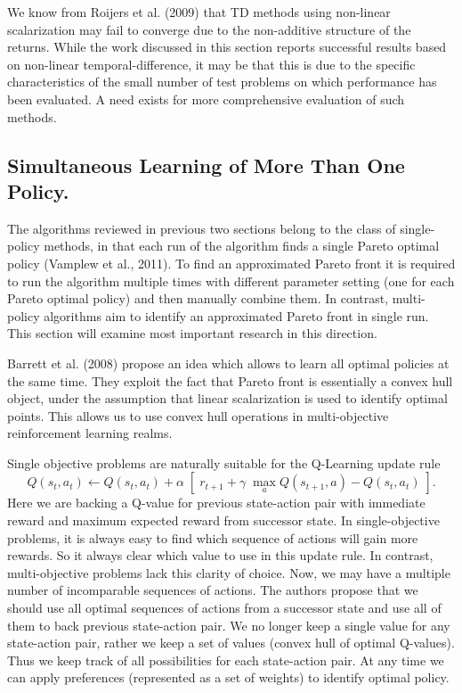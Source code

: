 We know from Roijers et al. (2009)\nocite{roijers2013survey} that TD methods using non-linear scalarization may fail to converge due to the non-additive structure of the returns. While the work discussed in this section reports successful results based on non-linear temporal-difference, it may be that this is due to the specific characteristics of the small number of test problems on which performance has been evaluated. A need exists for more comprehensive evaluation of such methods.

\subsection{Simultaneous Learning of More Than One Policy.}

The algorithms reviewed in previous two sections belong to the class of single-policy methods, in that each run of the algorithm finds a single Pareto optimal policy (Vamplew et al., 2011\nocite{vamplew2011empirical}). To find an approximated Pareto front it is required to run the algorithm multiple times with different parameter setting (one for each Pareto optimal policy) and then manually combine them. In contrast, multi-policy algorithms aim to identify an approximated Pareto front in single run. This section will examine most important research in this direction.

Barrett et al. (2008) \nocite{barrett2008learning} propose an idea which allows to learn all optimal policies at the same time. They exploit the fact that Pareto front is essentially a convex hull object, under the assumption that linear scalarization is used to identify optimal points. This allows us to use convex hull operations in multi-objective reinforcement learning realms.

Single objective problems are naturally suitable for the Q-Learning update rule
$$ Q(s_{t},a_{t}) \leftarrow Q(s_{t},a_{t}) + \alpha \; \left[\;r_{t+1} + \gamma\; \max_{a}Q(s_{t+1},a) - Q(s_{t},a_{t})\;\right]. $$
Here we are backing a Q-value for previous state-action pair with immediate reward and maximum expected reward from successor state. In single-objective problems, it is always easy to find which sequence of actions will gain more rewards. So it always clear which value to use in this update rule. In contrast, multi-objective problems lack this clarity of choice. Now, we may have a multiple number of incomparable sequences of actions. The authors propose that we should use all optimal sequences of actions from a successor state and use all of them to back previous state-action pair. We no longer keep a single value for any state-action pair, rather we keep a set of values (convex hull of optimal Q-values). Thus we keep track of all possibilities for each state-action pair. At any time we can apply preferences (represented as a set of weights) to identify optimal policy.

